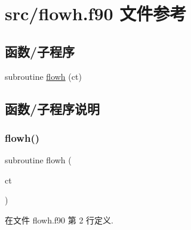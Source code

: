 \hypertarget{flowh_8f90}{}\section{src/flowh.f90 文件参考}
\label{flowh_8f90}
\subsection*{函数/子程序}
\begin{DoxyCompactItemize}
\item 
subroutine \mbox{\hyperlink{flowh_8f90_a41966839b7347b09a6078b3d0451c2e0}{flowh}} (ct)
\end{DoxyCompactItemize}


\subsection{函数/子程序说明}
\mbox{\label{flowh_8f90_a41966839b7347b09a6078b3d0451c2e0}} 
\subsubsection{\texorpdfstring{flowh()}{flowh()}}
{\footnotesize\ttfamily subroutine flowh (\begin{DoxyParamCaption}\item[{}]{ct }\end{DoxyParamCaption})}



在文件 flowh.\+f90 第 2 行定义.

